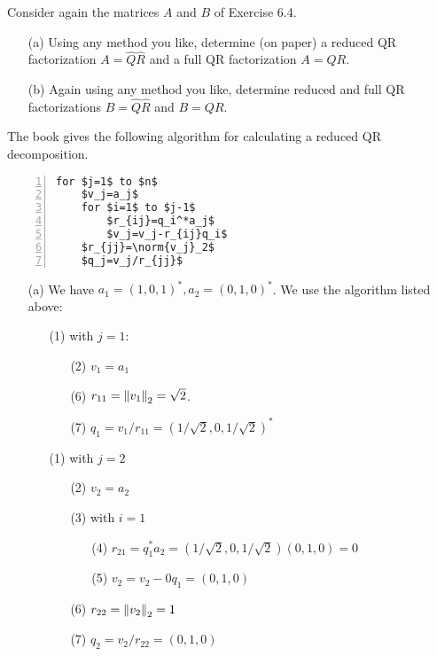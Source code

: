 \documentclass[10pt]{article}
\begin{document}
\begin{problem}[Exercise 7.1]
Consider again the matrices \( A \) and \( B \) of Exercise 6.4.
\begin{enumerate}
    \item[(a)] Using any method you like, determine (on paper) a reduced QR factorization \( A=\hat{Q}\hat{R} \) and a full QR factorization \( A=QR \).
    \item[(b)] Again using any method you like, determine reduced and full QR factorizations \( B=\hat{Q}\hat{R} \) and \( B=QR \).
\end{enumerate}
\end{problem}

\begin{solution}[Solution]
    The book gives the following algorithm for calculating a reduced QR decomposition.
\begin{lstlisting}[mathescape=true, numbers=left, xleftmargin=2em,frame=single,framexleftmargin=1.5em]
for $j=1$ to $n$
    $v_j=a_j$
    for $i=1$ to $j-1$
        $r_{ij}=q_i^*a_j$
        $v_j=v_j-r_{ij}q_i$
    $r_{jj}=\norm{v_j}_2$
    $q_j=v_j/r_{jj}$
\end{lstlisting}
\begin{enumerate}
    \item[(a)] We have \( a_1 = (1,0,1)^*, a_2=(0,1,0)^* \).
    We use the algorithm listed above:    
        \begin{enumerate}  
        \item[(1)] with \( j=1 \):
            \begin{enumerate}
                \item[(2)]  \( v_1=a_1 \)
                \item[(6)]  \( r_{11} = \left\lVert v_1\right\rVert_2 = \sqrt{2} \).
                \item[(7)]  \( q_1 = v_1/r_{11} = (1/\sqrt{2},0,1/\sqrt{2})^* \)
            \end{enumerate}
        \item[(1)] with \( j=2 \)
            \begin{enumerate}
                \item[(2)] \( v_2=a_2 \)
                \item[(3)] with \( i=1 \)
                    \begin{enumerate}
                        \item[(4)] \( r_{21}=q_1^*a_2 = (1/\sqrt{2},0,1/\sqrt{2})(0,1,0) = 0  \)
                        \item[(5)] \( v_2=v_2-0q_1 = (0,1,0) \)
                    \end{enumerate}
                \item[(6)] \( r_{22}=\left\lVert v_2\right\rVert_2 = 1 \)
                \item[(7)] \( q_2 = v_2/r_{22} = (0,1,0) \)
            \end{enumerate}
        \end{enumerate}


\end{enumerate}
\end{solution}
\end{document}
